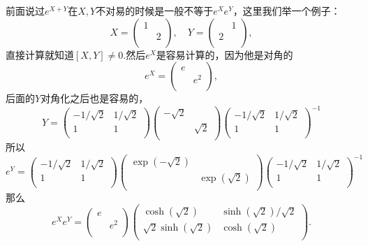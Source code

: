 \documentclass[9pt]{extbook}
\theoremstyle{plain}
\begin{document}
前面说过$e^{X+Y}$在$X,Y$不对易的时候是一般不等于$e^Xe^Y$，这里我们举一个例子：
\[
X=\begin{pmatrix}
1&\\
&2\\
\end{pmatrix},
\quad
Y=\begin{pmatrix}
&1\\
2&\\
\end{pmatrix},
\]
直接计算就知道$[X,Y]\neq 0$.然后$e^X$是容易计算的，因为他是对角的
\[
e^X=\begin{pmatrix}
e&\\
&e^2\\
\end{pmatrix},
\]
后面的$Y$对角化之后也是容易的，
\[
Y=
\begin{pmatrix}
 -1/\sqrt{2} & 1/\sqrt{2} \\
 1 & 1 \\
\end{pmatrix}
\begin{pmatrix}
 -\sqrt{2} &  \\
  & \sqrt{2} \\
\end{pmatrix}
\begin{pmatrix}
 -1/\sqrt{2} & 1/\sqrt{2} \\
 1 & 1 \\
\end{pmatrix}^{-1}
\]
所以
\[
e^Y=
\begin{pmatrix}
 -1/\sqrt{2} & 1/\sqrt{2} \\
 1 & 1 \\
\end{pmatrix}
\begin{pmatrix}
 \exp(-\sqrt{2}) &  \\
  & \exp(\sqrt{2}) \\
\end{pmatrix}
\begin{pmatrix}
 -1/\sqrt{2} & 1/\sqrt{2} \\
 1 & 1 \\
\end{pmatrix}^{-1}
\]
那么
\[
e^Xe^Y=
\begin{pmatrix}
e&\\
&e^2\\
\end{pmatrix}
\begin{pmatrix}
\cosh \left(\sqrt{2}\right)&\sinh \left(\sqrt{2}\right)/\sqrt{2}\\
\sqrt{2} \sinh \left(\sqrt{2}\right)&\cosh \left(\sqrt{2}\right)\\
\end{pmatrix}.
\]
\end{document}
